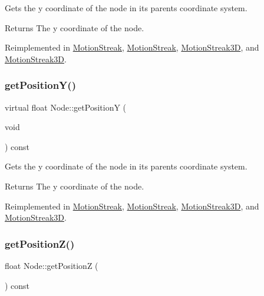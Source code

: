 Gets the y coordinate of the node in its parent\textquotesingle{}s coordinate system.

\begin{DoxyReturn}{Returns}
The y coordinate of the node. 
\end{DoxyReturn}


Reimplemented in \hyperlink{classMotionStreak_a05d60b5b380417f870046d8aa5f6626b}{Motion\+Streak}, \hyperlink{classMotionStreak_a4138d128c57dad6a41f8d51bbf13a0f8}{Motion\+Streak}, \hyperlink{classMotionStreak3D_a9880e5a12cec812ba36804232e73bd7b}{Motion\+Streak3D}, and \hyperlink{classMotionStreak3D_aad2e9762fabf564601865096174a9b54}{Motion\+Streak3D}.

\mbox{\label{classNode_ac6335e604f0c11512e45f607f38e72ec}} 
\subsubsection{\texorpdfstring{get\+Position\+Y()}{getPositionY()}\hspace{0.1cm}{\footnotesize\ttfamily [2/2]}}
{\footnotesize\ttfamily virtual float Node\+::get\+PositionY (\begin{DoxyParamCaption}\item[{void}]{ }\end{DoxyParamCaption}) const\hspace{0.3cm}{\ttfamily [virtual]}}

Gets the y coordinate of the node in its parent\textquotesingle{}s coordinate system.

\begin{DoxyReturn}{Returns}
The y coordinate of the node. 
\end{DoxyReturn}


Reimplemented in \hyperlink{classMotionStreak_a05d60b5b380417f870046d8aa5f6626b}{Motion\+Streak}, \hyperlink{classMotionStreak_a4138d128c57dad6a41f8d51bbf13a0f8}{Motion\+Streak}, \hyperlink{classMotionStreak3D_a9880e5a12cec812ba36804232e73bd7b}{Motion\+Streak3D}, and \hyperlink{classMotionStreak3D_aad2e9762fabf564601865096174a9b54}{Motion\+Streak3D}.

\mbox{\label{classNode_a0c6023aabdeeff9cf981ad81e6aaed9c}} 
\subsubsection{\texorpdfstring{get\+Position\+Z()}{getPositionZ()}\hspace{0.1cm}{\footnotesize\ttfamily [1/2]}}
{\footnotesize\ttfamily float Node\+::get\+PositionZ (\begin{DoxyParamCaption}{ }\end{DoxyParamCaption}) const\hspace{0.3cm}{\ttfamily [virtual]}}

